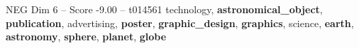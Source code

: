 \begin{textsample}{NEG Dim 6 – Score -9.00 – t014561}  \label{ex:f6_neg_021}
technology, \textbf{astronomical\_object}, \textbf{publication}, advertising, \textbf{poster}, \textbf{graphic\_design}, \textbf{graphics}, science, \textbf{earth}, \textbf{astronomy}, \textbf{sphere}, \textbf{planet}, \textbf{globe}

\end{textsample}

